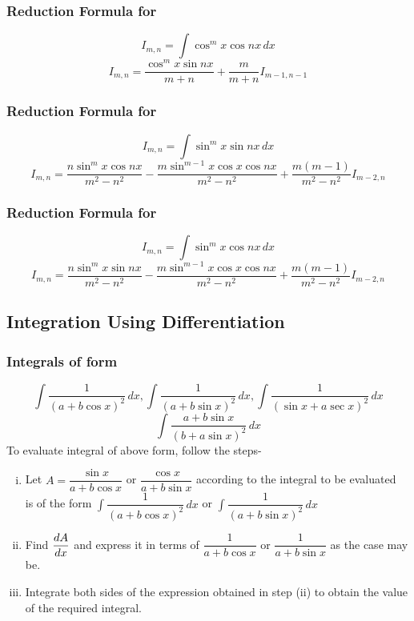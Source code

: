 \documentclass{article}
\begin{document}
\subsubsection{Reduction Formula for }
$$I_{m,n}=\displaystyle\int \cos^m x \cos nx  \, dx$$
$$I_{m,n}=\dfrac{\cos^m x \sin nx}{m+n}+\dfrac{m}{m+n}I_{m-1,n-1}$$
\subsubsection{Reduction Formula for }
$$I_{m,n}=\displaystyle\int \sin^m x \sin nx  \, dx$$
$$I_{m,n}=\dfrac{n\sin^m x \cos nx }{m^2 - n^2}- \dfrac{m\sin^{m-1}x \cos x \cos nx}{m^2-n^2}+\dfrac{m(m-1)}{m^2-n^2}I_{m-2,n}$$
\subsubsection{Reduction Formula for }
$$I_{m,n}=\displaystyle\int \sin^m x \cos nx  \, dx$$
$$I_{m,n}=\dfrac{n\sin^m x \sin nx}{m^2-n^2}- \dfrac{m \sin^{m-1}x \cos x \cos nx }{m^2-n^2}+\dfrac{m(m-1)}{m^2-n^2}I_{m-2,n}$$
\subsection{Integration Using Differentiation}
\subsubsection*{Integrals of form }
$$\displaystyle\int \dfrac{1}{(a+b\cos x)^2} \, dx, \displaystyle\int \dfrac{1}{(a+b\sin x)^2} \, dx, \displaystyle\int \dfrac{1}{(\sin x + a \sec x)^2} \, dx$$
$$\displaystyle\int \dfrac{a+b \sin x}{(b + a \sin x)^2} \, dx$$
To evaluate integral of above form, follow the steps- 
\begin{enumerate}[i.]
    \item Let $A=\dfrac{\sin x}{a+b\cos x }$ or $\dfrac{\cos x }{a+b \sin x}$ according to the integral to be evaluated \\[2mm]
     is of the form $\displaystyle\int \dfrac{1}{(a+b \cos x)^2} \, dx$ or $\displaystyle\int \dfrac{1}{(a+b\sin x)^2} \, dx$
     \item Find $\displaystyle\dv{A}{x}$ and express it in terms of $\dfrac{1}{a+b\cos x}$ or $\dfrac{1}{a+b\sin x}$ as the case may be.
     \item Integrate both sides of the expression obtained in step (ii) to obtain the value of the required integral.
\end{enumerate}
\end{document}
